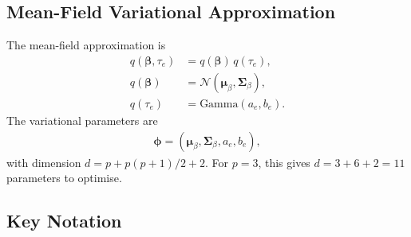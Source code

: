 \documentclass[11pt,a4paper]{article}
\newcommand{\N}{\mathcal{N}}
\begin{document}
\subsection{Mean-Field Variational Approximation}

The mean-field approximation is
\begin{align}
q(\bm{\beta}, \tau_e) &= q(\bm{\beta})\,q(\tau_e),\\
q(\bm{\beta}) &= \N(\bm{\mu}_\beta, \bm{\Sigma}_\beta),\\
q(\tau_e) &= \text{Gamma}(a_e, b_e).
\end{align}
The variational parameters are
\begin{align}
\bm{\phi} = (\bm{\mu}_\beta,\bm{\Sigma}_\beta,a_e,b_e),
\end{align}
with dimension $d=p+p(p+1)/2+2$. For $p=3$, this gives $d=3+6+2=11$ parameters to optimise.

\subsection{Key Notation}
\end{document}
